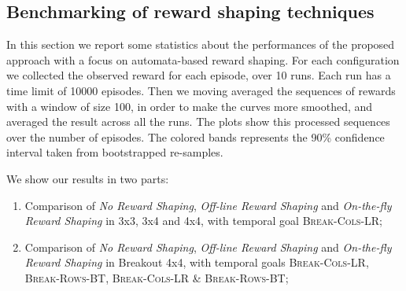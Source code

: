 \subsection{Benchmarking of reward shaping techniques}\label{sect:breakout-benchmarking-rs}
In this section we report some statistics about the performances of the proposed approach with a focus on automata-based reward shaping.
For each configuration we collected the observed reward for each episode, over 10 runs. Each run has a time limit of 10000 episodes.
Then we moving averaged the sequences of rewards with a window of size 100, in order to make the curves more smoothed, and averaged the result across all the runs. The plots show this processed sequences  over the number of episodes. The colored bands represents the 90\% confidence interval taken from bootstrapped re-samples.

We show our results in two parts:
\begin{enumerate}
	\item Comparison of \emph{No Reward Shaping}, \emph{Off-line Reward Shaping} and \emph{On-the-fly Reward Shaping} in \Breakout 3x3, 3x4 and 4x4, with temporal goal \textsc{Break-Cols-LR};
	\item Comparison of \emph{No Reward Shaping}, \emph{Off-line Reward Shaping} and \emph{On-the-fly Reward Shaping} in Breakout 4x4, with temporal goals \textsc{Break-Cols-LR}, \textsc{Break-Rows-BT}, \textsc{Break-Cols-LR \& Break-Rows-BT};
\end{enumerate}

